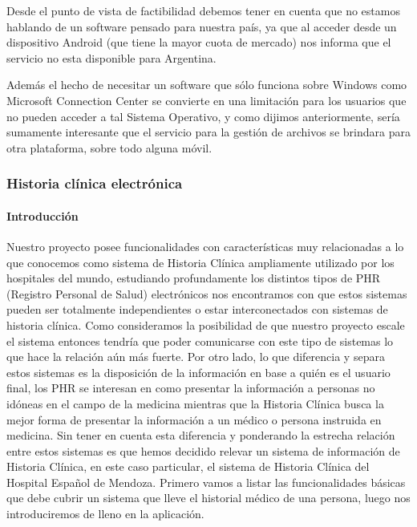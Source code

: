 \begin{itemize}
	Desde el punto de vista de factibilidad debemos tener en cuenta que no estamos hablando de un software pensado para nuestra país, ya que al acceder desde un dispositivo Android (que tiene la mayor cuota de mercado)  nos informa que el servicio no esta disponible para Argentina. 
	
	Además el hecho de necesitar un software que sólo funciona sobre Windows como Microsoft Connection Center se convierte en una limitación para los usuarios que no pueden acceder a tal Sistema Operativo, y como dijimos anteriormente, sería sumamente interesante que el servicio para la gestión de archivos se brindara para otra plataforma, sobre todo alguna móvil.
\end{itemize}



\clearpage
\subsubsection{Historia clínica electrónica}


\paragraph{Introducción}
Nuestro proyecto posee funcionalidades con características muy relacionadas a lo que conocemos como sistema de Historia Clínica ampliamente utilizado por los hospitales del mundo, estudiando profundamente los distintos tipos de PHR (Registro Personal de Salud) electrónicos nos encontramos con que estos sistemas pueden ser totalmente independientes o estar interconectados con sistemas de historia clínica. Como consideramos la posibilidad de que nuestro proyecto escale el sistema entonces tendría que poder comunicarse con este tipo de sistemas lo que hace la relación aún más fuerte. Por otro lado, lo que diferencia y separa estos sistemas es la disposición de la información en base a quién es el usuario final, los PHR se interesan en como presentar la información a personas no idóneas en el campo de la medicina mientras que la Historia Clínica busca la mejor forma de presentar la información a un médico o persona instruida en medicina. Sin tener en cuenta esta diferencia y ponderando la estrecha relación entre estos sistemas es que hemos decidido relevar un sistema de información de Historia Clínica, en este caso particular, el sistema de Historia Clínica del Hospital Español de Mendoza.
Primero vamos a listar las funcionalidades básicas que debe cubrir un sistema que lleve el historial médico de una persona, luego nos introduciremos de lleno en la aplicación.


